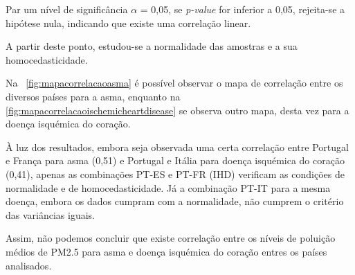 \documentclass[conference]{IEEEtran}
\begin{document}
Par um nível de significância $\alpha$ = 0,05, se \textit{p-value} for inferior a 0,05, rejeita-se a hipótese nula, indicando que existe uma correlação linear.
 
A partir deste ponto, estudou-se a normalidade das amostras e a sua homocedasticidade. 


Na \figurename~\ref{fig:mapacorrelacaoasma} é possível observar o mapa de correlação entre os diversos países para a asma, enquanto na \figurename~ \ref{fig:mapacorrelacaoischemicheartdisease} se observa outro mapa, desta vez para a doença isquémica do coração.


À luz dos resultados, embora seja observada uma certa correlação entre Portugal e França para asma (0,51) e Portugal e Itália para doença isquémica do coração (0,41), apenas as combinações PT-ES e PT-FR (IHD) verificam as condições de normalidade e de homocedasticidade. Já a combinação PT-IT para a mesma doença, embora os dados cumpram com a normalidade, não cumprem o critério das variâncias iguais.

Assim, não podemos concluir que existe correlação entre os níveis de poluição médios de PM2.5 para asma e doença isquémica do coração entres os países analisados.
\end{document}
